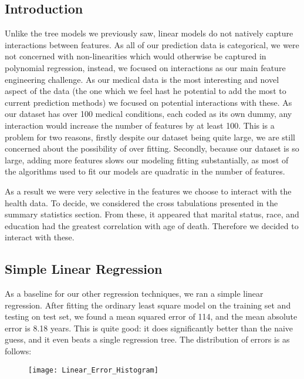 \documentclass[letterpaper, 10 pt, conference]{ieeeconf}  %
\begin{document}
\subsection{Introduction}
Unlike the tree models we previously saw, linear models do not natively capture interactions between features. As all of our prediction data is categorical, we were not concerned with non-linearities which would otherwise be captured in polynomial regression, instead, we focused on interactions as our main feature engineering challenge. As our medical data is the most interesting and novel aspect of the data (the one which we feel hast he potential to add the most to current prediction methods) we focused on potential interactions with these. As our dataset has over 100 medical conditions, each coded as its own dummy, any interaction would increase the number of features by at least 100. This is a problem for two reasons, firstly despite our dataset being quite large, we are still concerned about the possibility of over fitting. Secondly, because our dataset is so large, adding more features slows our modeling fitting substantially, as most of the algorithms used to fit our models are quadratic in the number of features. 

As a result we were very selective in the features we choose to interact with the health data. To decide, we considered the cross tabulations presented in the summary statistics section. From these, it appeared that marital status, race, and education had the greatest correlation with age of death. Therefore we decided to interact with these. 

\subsection{Simple Linear Regression}
As a baseline for our other regression techniques, we ran a simple linear regression. After fitting the ordinary least square model on the training set and testing on test set, we found a mean squared error of 114, and the mean absolute error is 8.18 years. This is quite good: it does significantly better than the naive guess, and it even beats a single regression tree. The distribution of errors is as follows:

\begin{figure}[ht]
\label{Linear Regression Error Plot}
\begin{center}
\texttt{[image: Linear\_Error\_Histogram]}
\end{center}
\end{figure}
\end{document}
